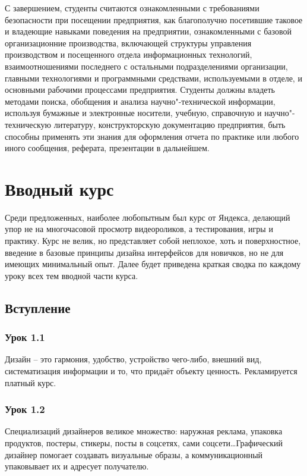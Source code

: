 \documentclass[variant=practice]{bsuir}
\begin{document}
С завершением, студенты считаются ознакомленными с требованиями безопасности при
посещении предприятия, как благополучно посетившие таковое и владеющие навыками
поведения на предприятии, ознакомленными с базовой организационние
производства, включающей структуры управления производством и посещенного отдела
информационных технологий, взаимоотношениями последнего с остальными
подразделениями организации, главными технологиями и программными средствами,
используемыми в отделе, и основными рабочими процессами предприятия. Студенты
должны владеть методами поиска, обобщения и анализа научно"-технической
информации, используя бумажные и электронные носители, учебную, справочную и
научно"-техническую литературу, конструкторскую документацию предприятия, быть
способны применять эти знания для оформления отчета по практике или любого иного
сообщения, реферата, презентации в дальнейшем\cite{about-practice}.

\chapter{Вводный курс }

Среди предложенных, наиболее любопытным был курс от Яндекса\cite{about-yandex},
делающий упор не на многочасовой просмотр видеороликов, а тестирования, игры и
практику. Курс не велик, но представляет собой неплохое, хоть и поверхностное,
введение в базовые принципы дизайна интерфейсов для новичков, но не для имеющих
минимальный опыт. Далее будет приведена краткая сводка по каждому уроку всех
тем вводной части курса.

\section{Вступление}

\subsection{Урок 1.1} Дизайн -- это гармония, удобство, устройство чего-либо,
внешний вид, систематизация информации и то, что придаёт объекту ценность.
Рекламируется платный курс.

\subsection{Урок 1.2} Специализаций дизайнеров великое множество: наружная
реклама, упаковка продуктов, постеры, стикеры, посты в соцсетях, сами
соцсети\dots Графический дизайнер помогает создавать визуальные образы, а
коммуникационный упаковывает их и адресует получателю.
\end{document}
